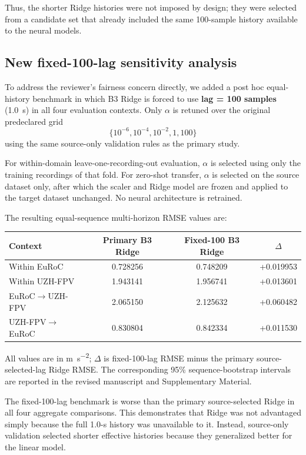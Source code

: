 \documentclass[12pt,a4paper]{article}
\begin{document}
Thus, the shorter Ridge histories were not imposed by design; they were selected from a candidate set that already included the same 100-sample history available to the neural models.

\subsection*{New fixed-100-lag sensitivity analysis}

To address the reviewer's fairness concern directly, we added a post hoc equal-history benchmark in which B3 Ridge is forced to use \textbf{lag = 100 samples} (\SI{1.0}{\second}) in all four evaluation contexts. Only $\alpha$ is retuned over the original predeclared grid
\[
\{10^{-6},10^{-4},10^{-2},1,100\}
\]
using the same source-only validation rules as the primary study.

For within-domain leave-one-recording-out evaluation, $\alpha$ is selected using only the training recordings of that fold. For zero-shot transfer, $\alpha$ is selected on the source dataset only, after which the scaler and Ridge model are frozen and applied to the target dataset unchanged. No neural architecture is retrained.

The resulting equal-sequence multi-horizon RMSE values are:

\begin{center}
\begin{tabular}{lccc}
\hline
Context & Primary B3 Ridge & Fixed-100 B3 Ridge & $\Delta$ \\
\hline
Within EuRoC & 0.728256 & 0.748209 & +0.019953 \\
Within UZH-FPV & 1.943141 & 1.956741 & +0.013601 \\
EuRoC$\rightarrow$UZH-FPV & 2.065150 & 2.125632 & +0.060482 \\
UZH-FPV$\rightarrow$EuRoC & 0.830804 & 0.842334 & +0.011530 \\
\hline
\end{tabular}
\end{center}

All values are in \si{\metre\per\second\squared}; $\Delta$ is fixed-100-lag RMSE minus the primary source-selected-lag Ridge RMSE. The corresponding 95\% sequence-bootstrap intervals are reported in the revised manuscript and Supplementary Material.

The fixed-100-lag benchmark is worse than the primary source-selected Ridge in all four aggregate comparisons. This demonstrates that Ridge was not advantaged simply because the full 1.0-s history was unavailable to it. Instead, source-only validation selected shorter effective histories because they generalized better for the linear model.
\end{document}
